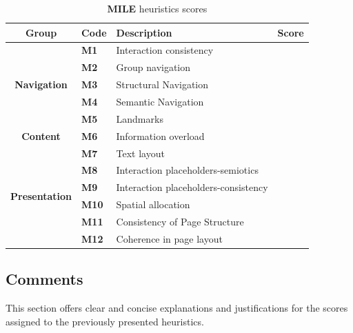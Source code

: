 \begin{table}[htp!]
	\centering
	\begin{tabular}{ |c|l|l|c| }
		\hline
		\textbf{Group} & \textbf{Code} & \textbf{Description} & \textbf{Score}\\
		\hline
		\multirow{5}{*}{\textbf{Navigation}} & \textbf{M1} & Interaction consistency & \textbf{\color{unicefGreen}{4}}\\
		\cline{2-4}
		& \textbf{M2} & Group navigation & \textbf{\color{unicefGreen}{4}}\\
		\cline{2-4}
		& \textbf{M3} & Structural Navigation & \textbf{\color{unicefGreen}{4}}\\
		\cline{2-4}
		& \textbf{M4} & Semantic Navigation & \textbf{\color{unicefGreen}{5}}\\
		\cline{2-4}
		& \textbf{M5} & Landmarks & \textbf{\color{unicefGreen}{4}}\\
		\hline
		\textbf{Content} & \textbf{M6} & Information overload & \textbf{\color{unicefGreen}{4}}\\
		\hline
		\multirow{6}{*}{\textbf{Presentation}} & \textbf{M7} & Text layout & \textbf{\color{unicefGreen}{5}}\\
		\cline{2-4}
		& \textbf{M8} & Interaction placeholders-semiotics & \textbf{\color{unicefGreen}{4}}\\
		\cline{2-4}
		& \textbf{M9} & Interaction placeholders-consistency & \textbf{\color{unicefGreen}{4}}\\
		\cline{2-4}
		& \textbf{M10} & Spatial allocation & \textbf{\color{unicefGreen}{4}}\\
		\cline{2-4}
		& \textbf{M11} & Consistency of Page Structure & \textbf{\color{unicefGreen}{4}}\\
		\cline{2-4}
		& \textbf{M12} & Coherence in page layout & \textbf{\color{unicefGreen}{5}}\\
		\hline
	\end{tabular}
	\caption{\textbf{MILE} heuristics scores}
\end{table}
\newpage
\subsection{Comments}
This section offers clear and concise explanations and justifications for the scores assigned to the previously presented heuristics.
